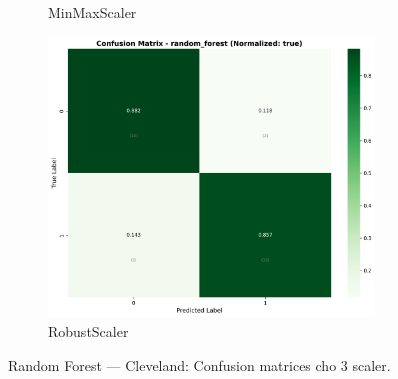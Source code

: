 \begin{figure}[H]
\begin{subfigure}[b]{0.31\textwidth}
\caption{MinMaxScaler}
\label{fig:rf_clev_cm_minmax}
\end{subfigure}\hfill
\begin{subfigure}[b]{0.31\textwidth}
\centering
\includegraphics[width=0.95\textwidth]{Result/cleveland_dataset/confusion_matrices/random_forest_numeric_dataset_RobustScaler.png}
\caption{RobustScaler}
\label{fig:rf_clev_cm_robust}
\end{subfigure}
\caption{Random Forest — Cleveland: Confusion matrices cho 3 scaler.}
\label{fig:rf_clev_confusions}
\end{figure}

